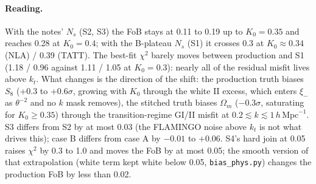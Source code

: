 \documentclass[11pt]{article}
\newcommand{\hmpc}{\,h\,\mathrm{Mpc}^{-1}}
\begin{document}
\paragraph{Reading.} With the notes' $N_s$ (S2, S3) the FoB stays at 0.11 to
0.19 up to $K_0 = 0.35$ and reaches 0.28 at $K_0 = 0.4$; with the B-plateau
$N_s$ (S1) it crosses 0.3 at $K_0 \approx 0.34$ (NLA) / 0.39 (TATT). The
best-fit $\chi^2$ barely moves between production and S1 (1.18 / 0.96 against
1.11 / 1.05 at $K_0 = 0.3$): nearly all of the residual misfit lives above
$k_t$. What changes is the direction of the shift: the production truth
biases $S_8$ (+0.3 to +0.6$\sigma$, growing with $K_0$ through the white II
excess, which enters $\xi_-$ as $\theta^{-2}$ and no $k$ mask removes), the
stitched truth biases $\Omega_m$ ($-0.3\sigma$, saturating for $K_0 \ge
0.35$) through the transition-regime GI/II misfit at $0.2 \lesssim k
\lesssim 1\hmpc$. S3 differs from S2 by at most 0.03 (the FLAMINGO noise
above $k_t$ is not what drives this); case B differs from case A by $-0.01$
to $+0.06$. S4's hard join at 0.05 raises $\chi^2$ by 0.3 to 1.0 and moves
the FoB by at most 0.05; the smooth version of that extrapolation (white
term kept white below 0.05, \texttt{bias\_phys.py}) changes the production
FoB by less than 0.02.
\end{document}
